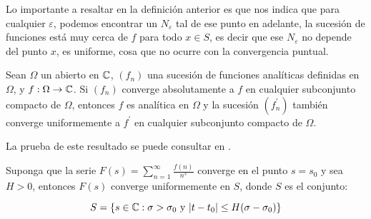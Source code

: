 Lo importante a resaltar en la definición anterior es  que nos indica que para cualquier $\varepsilon$, podemos encontrar un $N_\varepsilon$ tal de ese punto en adelante, la sucesión de funciones está muy cerca de $f$ para todo $x\in S$, es decir que ese $N_\varepsilon$ no depende del punto $x$, es uniforme, cosa que no ocurre con la convergencia puntual.

\begin{theorem}
Sean $\Omega$ un abierto en $\mathbb{C}$, $(f_n)$ una sucesión de funciones analíticas definidas en $\Omega$, y $f:\Omega\to\mathbb{C}$. Si $(f_n)$ converge absolutamente a $f$ en cualquier subconjunto compacto de $\Omega$, entonces $f$ es analítica en $\Omega$ y la sucesión $(f_n^{\prime})$ también converge uniformemente a $f^{\prime}$ en cualquier subconjunto compacto de $\Omega$.
\end{theorem}

La prueba de este resultado se puede consultar  en \cite{stein2010complex}.
\begin{comment}
\begin{theorem}
Sea $\Omega\subseteq \C$ un abierto y sea $f:\Omega\to \C$ una función analítica, si $f(s_n)=0$ para infinitos puntos de $(s_n)$ y $(s_n)$ converge a $x\in \Omega$, entonces $f(s)=0$ para todo $s\in \Omega$
\end{theorem}
\end{comment}


\begin{theorem}
Suponga que la serie $F(s)=\displaystyle\sum_{n=1}^{\infty} \frac{f(n)}{n^s}$ converge en el punto $s=s_0$ y sea $H>0$, entonces $F(s)$ converge uniformemente en $S$, donde $S$ es el conjunto:

$$S=\{s\in \mathbb{C} : \sigma>\sigma_0 \text{ y } |t-t_0|\leq H(\sigma-\sigma_0)\}$$
\end{theorem}
\begin{center}

\end{center}